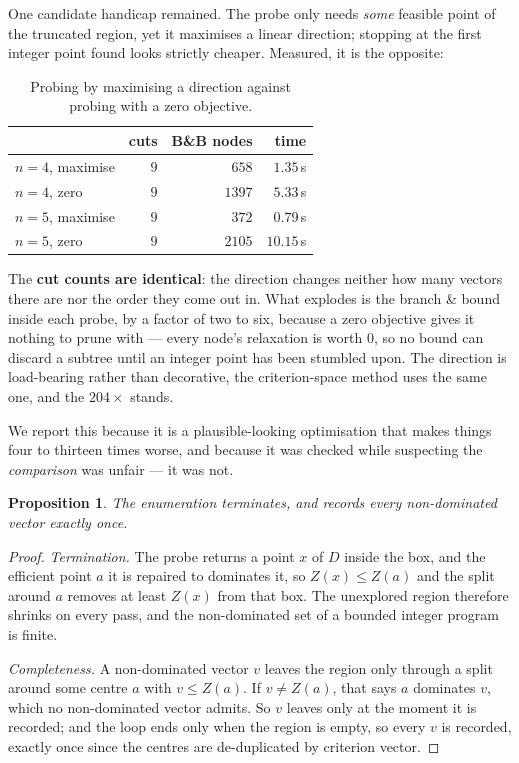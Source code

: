 \documentclass[11pt,a4paper]{article}
\newtheorem{proposition}{Proposition}
\newcommand{\Z}{Z}
\newcommand{\Dset}{D}
\begin{document}
One candidate handicap remained.  The probe only needs \emph{some} feasible
point of the truncated region, yet it maximises a linear direction; stopping at
the first integer point found looks strictly cheaper.  Measured, it is the
opposite:

\begin{table}[h]
\centering
\caption{Probing by maximising a direction against probing with a zero
objective.}
\begin{tabular}{lrrr}
\toprule
 & cuts & B\&B nodes & time \\
\midrule
$n=4$, maximise & $9$ & $658$  & $1.35$\,s \\
$n=4$, zero     & $9$ & $1397$ & $5.33$\,s \\
$n=5$, maximise & $9$ & $372$  & $0.79$\,s \\
$n=5$, zero     & $9$ & $2105$ & $10.15$\,s \\
\bottomrule
\end{tabular}
\end{table}

\noindent
The \textbf{cut counts are identical}: the direction changes neither how many
vectors there are nor the order they come out in.  What explodes is the branch
\& bound inside each probe, by a factor of two to six, because a zero objective
gives it nothing to prune with --- every node's relaxation is worth $0$, so no
bound can discard a subtree until an integer point has been stumbled upon.  The
direction is load-bearing rather than decorative, the criterion-space method
uses the same one, and the $204\times$ stands.

We report this because it is a plausible-looking optimisation that makes things
four to thirteen times worse, and because it was checked while suspecting the
\emph{comparison} was unfair --- it was not.

\begin{proposition}\label{prop:front}
The enumeration terminates, and records every non-dominated vector exactly
once.
\end{proposition}

\begin{proof}
\emph{Termination.}  The probe returns a point $x$ of $\Dset$ inside the box,
and the efficient point $a$ it is repaired to dominates it, so
$\Z(x) \leqslant \Z(a)$ and the split around $a$ removes at least $\Z(x)$ from
that box.  The unexplored region therefore shrinks on every pass, and the
non-dominated set of a bounded integer program is finite.

\emph{Completeness.}  A non-dominated vector $v$ leaves the region only through
a split around some centre $a$ with $v \leqslant \Z(a)$.  If $v \neq \Z(a)$,
that says $a$ dominates $v$, which no non-dominated vector admits.  So $v$
leaves only at the moment it is recorded; and the loop ends only when the
region is empty, so every $v$ is recorded, exactly once since the centres are
de-duplicated by criterion vector.
\end{proof}
\end{document}
